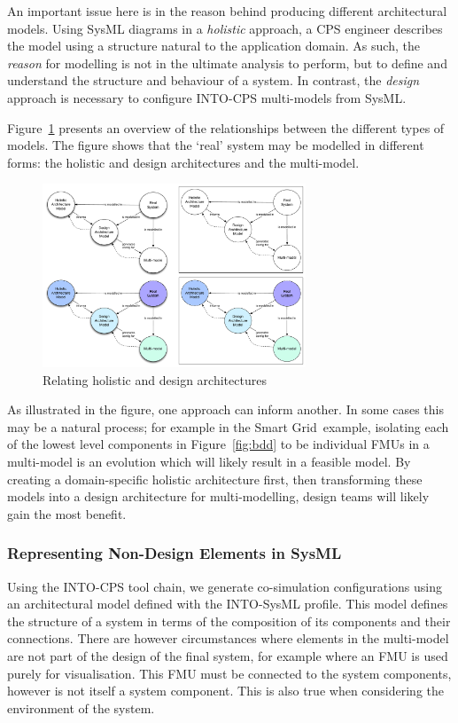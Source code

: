 An important issue here is in the reason behind producing different architectural models. Using SysML diagrams in a \emph{holistic} approach, a CPS engineer describes the model using a structure natural to the application domain. As such, the \emph{reason} for modelling is not in the ultimate analysis to perform, but to define and understand the structure and behaviour of a system. In contrast, the \emph{design} approach is necessary to configure INTO-CPS multi-models from SysML.

Figure~\ref{fig:sysml_mm} presents an overview of the relationships between the different types of models. The figure shows that the `real' system may be modelled in different forms: the holistic and design architectures and the multi-model.

\begin{figure}
\centering
\includegraphics[width=0.7\textwidth]{figures/sysml_for_mm}
\caption{Relating holistic and design architectures}
\label{fig:sysml_mm}
\end{figure}

As illustrated in the figure, one approach can inform another. In some cases this may be a natural process; for example in the Smart Grid\ example, isolating each of the lowest level components in Figure~\ref{fig:bdd} to be individual FMUs in a multi-model is an evolution which will likely result in a feasible model. By creating a domain-specific holistic architecture first, then transforming these models into a design architecture for multi-modelling, design teams will likely gain the most benefit.


\subsubsection{Representing Non-Design Elements in SysML}
\label{sec:sysml:non-design}

Using the INTO-CPS tool chain, we generate co-simulation configurations using an architectural model defined with the INTO-SysML profile. This model defines the structure of a system in terms of the composition of its components and their connections. There are however circumstances where elements in the multi-model are not part of the design of the final system, for example where an FMU is used purely for visualisation. This FMU must be connected to the system components, however is not itself a system component. This is also true when considering the environment of the system.

